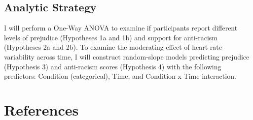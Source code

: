 \documentclass[
  english,
  man, noextraspace,floatsintext]{apa6}
\begin{document}
\hypertarget{analytic-strategy}{%
\subsection{Analytic Strategy}\label{analytic-strategy}}

I will perform a One-Way ANOVA to examine if participants report different levels of prejudice (Hypotheses 1a and 1b) and support for anti-racism (Hypotheses 2a and 2b). To examine the moderating effect of heart rate variability across time, I will construct random-slope models predicting prejudice (Hypothesis 3) and anti-racism scores (Hypothesis 4) with the following predictors: Condition (categorical), Time, and Condition x Time interaction.

\newpage

\hypertarget{references}{%
\section{References}\label{references}}

\setlength{\parindent}{-0.5in}
\setlength{\leftskip}{0.5in}
\end{document}
